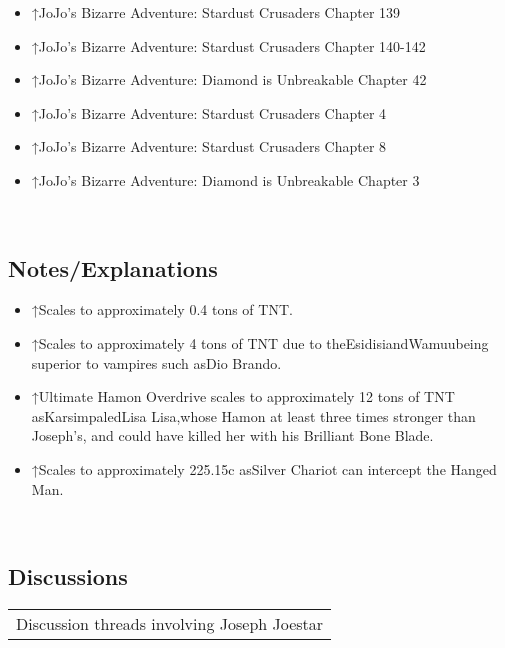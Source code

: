 \documentclass[a4paper,12pt]{article}
\begin{document}
\begin{itemize}
\item ↑JoJo's Bizarre Adventure: Stardust Crusaders Chapter 139
\item ↑JoJo's Bizarre Adventure: Stardust Crusaders Chapter 140-142
\item ↑JoJo's Bizarre Adventure: Diamond is Unbreakable Chapter 42
\item ↑JoJo's Bizarre Adventure: Stardust Crusaders Chapter 4
\item ↑JoJo's Bizarre Adventure: Stardust Crusaders Chapter 8
\item ↑JoJo's Bizarre Adventure: Diamond is Unbreakable Chapter 3
\end{itemize}\\ \par \vspace{0.5cm}

\subsection*{Notes/Explanations}\n\n\begin{itemize}
\item ↑Scales to approximately 0.4 tons of TNT.
\item ↑Scales to approximately 4 tons of TNT due to theEsidisiandWamuubeing superior to vampires such asDio Brando.
\item ↑Ultimate Hamon Overdrive scales to approximately 12 tons of TNT asKarsimpaledLisa Lisa,whose Hamon at least three times stronger than Joseph's, and could have killed her with his Brilliant Bone Blade.
\item ↑Scales to approximately 225.15c asSilver Chariot can intercept the Hanged Man.
\end{itemize}\\ \par \vspace{0.5cm}

\subsection*{Discussions}\n\n\begin{tabular}{|c|} \hline
Discussion threads involving Joseph Joestar \\
\end{tabular}\\ \par \vspace{0.5cm}
\end{document}
